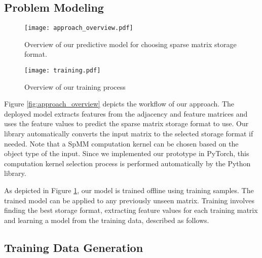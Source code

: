 \vspace{-2mm}
\subsection{Problem Modeling}
\vspace{-2mm}
\label{sec:ms}
\begin{figure}[t!]
\begin{minipage}[t]{0.5\linewidth}
\centering
\texttt{[image: approach\_overview.pdf]}
\vspace{-4mm}
\caption{Overview of our predictive model for choosing sparse matrix storage format.}
\label{fig:approach_overview}
\end{minipage}
\begin{minipage}[t]{0.5\linewidth}
\centering
\texttt{[image: training.pdf]}
\vspace{-4mm}
\caption{Overview of our training process}
\label{fig:training}
\end{minipage}
\vspace{-3mm}
\end{figure}

Figure \ref {fig:approach_overview} depicts the workflow of our approach. The deployed model extracts features from the adjacency
and feature matrices and uses the feature values to predict the sparse matrix storage format to use. Our library automatically converts the input matrix to the selected storage format if needed.
Note that a SpMM computation kernel can be chosen based on the object type of the input. Since we implemented our prototype in PyTorch, this computation kernel selection process is performed automatically by the Python library.

As depicted in Figure \ref{fig:training}, our model is trained offline using training samples. The trained model can be applied to
any previously unseen matrix. Training involves finding the best storage format, extracting feature values for each training
matrix and learning a model from the training data, described as follows.

\vspace{-2mm}
\subsection{Training Data Generation}\label{sec:dg}
\vspace{-1.5mm}

